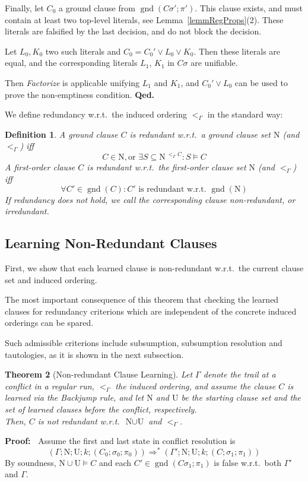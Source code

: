 \documentclass[a4paper]{article}
\newcommand{\mGnd}{\operatorname{gnd}} \newcommand{\mLVar}{\operatorname{lvar}} \newcommand{\mRVar}{\operatorname{rvar}} \newcommand{\mDmn}{\operatorname{dom}} \newcommand{\mRng}{\operatorname{rng}} \newcommand{\mMGU}{\operatorname{mgu}} \newcommand{\mDef}{\operatorname{def}} \newcommand{\mDomain}{\mathcal{D}} \newcommand{\mVar}{\operatorname{var}}
\newcommand{\startproof}{{\bf Proof:~}}
\newcommand{\finishproof}{{\bf Qed.}}
\newcommand{\leaveabit}{\\[6 pt]}
\newtheorem{defi}{Definition}[section]
\newtheorem{theo}[defi]{Theorem}
\begin{document}
Finally, let $C_0$ a ground clause from $\mGnd(C\sigma';\pi')$. 
This clause exists, and must contain at least two top-level literals, see Lemma~\ref{lemmRegProps}(2). 
These literals are falsified by the last decision, and do not block the decision. 

Let $L_0, K_0$ two such literals and $C_0 = C_0' \lor L_0 \lor K_0$. 
Then these literals are equal, and the corresponding literals $L_1$, $K_1$ in $C\sigma$ 
are unifiable. 

Then \emph{Factorize} is applicable unifying $L_1$ and $K_1$, and $C_0' \lor L_0$ can be used to prove the non-emptiness condition.
\finishproof

We define redundancy w.r.t.\ 
the induced ordering $<_{\Gamma}$ in the standard way:
\begin{defi}\label{a-redundancyDefs}
A ground clause $C$ is \emph{redundant w.r.t.\
a ground clause set $\text{N}$ (and $<_{\Gamma}$)} iff
\[C \in \text{N}, \text{or }\exists S \subseteq \text{N}^{~<_{\Gamma} C}: S \models C\]
A first-order clause $C$ is \emph{redundant w.r.t.\
the first-order clause set $\text{N}$ (and $<_{\Gamma}$)} iff
\[\forall C' \in \mGnd(C): C'\text{ is redundant w.r.t.~}\mGnd(\text{N})\]
If redundancy does not hold, we call the corresponding clause \emph{non-redundant}, or \emph{irredundant}.
\end{defi}
\subsection{Learning Non-Redundant Clauses}
First, we show that each learned clause is non-redundant w.r.t.\
the current clause set and induced ordering.

The most important consequence of this theorem that checking the learned clauses for 
redundancy criterions which are independent of the concrete induced orderings can be spared. 

Such admissible criterions include subsumption, subsumption resolution and tautologies, as it is shown in the next subsection. 

\begin{theo}[Non-redundant Clause Learning]\label{freshnessTheo}
Let $\Gamma$ denote the trail at a conflict in a regular run, $<_{\Gamma}$ the induced ordering, and 
assume the clause $C$ is learned via the \emph{Backjump} rule, and 
let $\text{N}$ and $\text{U}$ be the starting clause set and the set of learned clauses before the conflict, respectively.
\leaveabit
Then, $C$ is not redundant w.r.t.\
$\text{N}\cup\text{U}$ and $<_{\Gamma}$.
\end{theo}
\noindent
\startproof
Assume the first and last state in conflict resolution is 
\[(\Gamma; \text{N}; \text{U}; k; (C_0;\sigma_0;\pi_0)) \Rightarrow^* (\Gamma'; \text{N}; \text{U}; k; (C; \sigma_1; \pi_1))\]
By soundness, $\text{N}\cup\text{U} \models C$ 
and each $C' \in \mGnd(C\sigma_1; \pi_1)$ is false w.r.t.\
both $\Gamma'$ and $\Gamma$.
\end{document}
